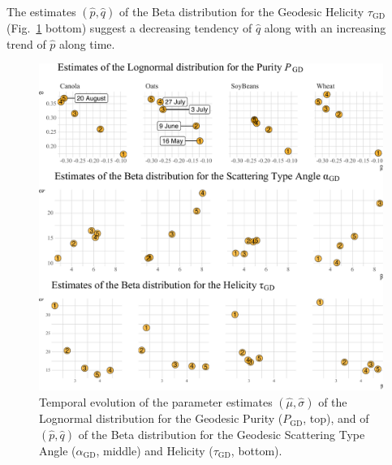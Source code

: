 \documentclass[journal]{IEEEtran}
\begin{document}
	The estimates $(\widehat p, \widehat q)$ of the Beta distribution for the Geodesic Helicity $\tau_{\text{GD}}$ (Fig.~\ref{fig:TemporalIndexes} bottom) suggest a decreasing tendency of $\widehat q$ along with an increasing trend of $\widehat p$ along time.
	\begin{figure}
		\centering
		\includegraphics[width=\columnwidth]{TemporalIndexes}
		\caption{Temporal evolution of the parameter estimates $(\widehat\mu,\widehat\sigma)$ of the Lognormal distribution for the Geodesic Purity ($P_{\text{GD}}$, top), and of $(\widehat p,\widehat q)$ of the Beta distribution for the Geodesic Scattering Type Angle ($\alpha_{\text{GD}}$, middle) and Helicity ($\tau_{\text{GD}}$, bottom).}\label{fig:TemporalIndexes}
	\end{figure}
	
\end{document}
